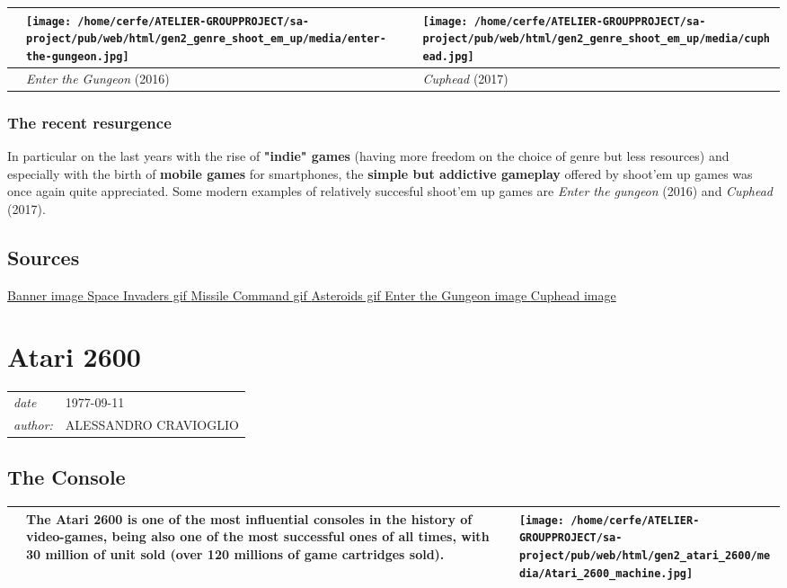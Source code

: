 \documentclass[a4paper,10pt]{book}
\newcommand{\pageHeader}[4]{
    \section{#1}
    \vspace{-0.3cm}
    \begin{table}[h!]
     \begin{tabular}{ll}
        \hline
        \textit{date} & #2 \\
        \textit{author: } & #3\\
        \hline
     \end{tabular}
    \end{table}
    \vspace{-0.3cm}
}
\begin{document}
 
 \begin{longtable}{p{1mm}|l|l|}\hline
 
 & \texttt{[image: /home/cerfe/ATELIER-GROUPPROJECT/sa-project/pub/web/html/gen2\_genre\_shoot\_em\_up/media/enter-the-gungeon.jpg]}
 & \texttt{[image: /home/cerfe/ATELIER-GROUPPROJECT/sa-project/pub/web/html/gen2\_genre\_shoot\_em\_up/media/cuphead.jpg]}
 \\\hline
 
 & \textit{Enter the Gungeon } (2016) 
 & \textit{Cuphead } (2017) 
 \\\hline
 \end{longtable}
 
 \subsubsection{The recent resurgence }
 
 
          In particular on the last years with the rise of  \textbf{"indie" games }  (having more freedom on the choice of genre but less resources) and especially with the birth of  \textbf{mobile games }  for smartphones,
          the  \textbf{simple but addictive gameplay }  offered by shoot'em up games was once again quite appreciated.
          Some modern examples of relatively succesful shoot'em up games are  \textit{Enter the gungeon }(2016) and  \textit{Cuphead }(2017).
         
 
 \subsection{Sources }
 \href{https://www.seekpng.com/png/full/77-774983_shoot-em-ups-logo-shoot-em-ups-logo.png}{Banner image }
 \href{https://miro.medium.com/max/1000/1*qFHnCDhep6OmqkbVN6NY_g.gif}{Space Invaders gif }  
 \href{https://i0.wp.com/www.techsavvyed.net/wp-content/uploads/2012/12/missile-command.gif?resize=598%2C444}{Missile Command gif }  
 \href{https://707232.smushcdn.com/1540253/wp-content/uploads/2020/01/asteroids-atari-2600.gif?lossy=1&strip=1&webp=1}{Asteroids gif }  
 \href{https://www.nintendoworldreport.com/media/44216/1/2.jpg}{Enter the Gungeon image }  
 \href{https://static.wikia.nocookie.net/cuphead/images/0/04/Pic01.jpg/revision/latest/scale-to-width-down/940?cb=20180514011844}{Cuphead image }  
 \newpage\pageHeader{Atari 2600}{1977-09-11}{ALESSANDRO CRAVIOGLIO}{The Atari 2600 is one of the most influential console of the world}
 \subsection{The Console }
 \begin{longtable}{p{1mm}|l|l|}\hline
 
 & \textbf{The Atari 2600 is one of the most influential consoles in the history of video-games, being also one of the most successful
                ones of all times, with 30 million of unit sold (over 120 millions of game cartridges sold). } 
 & \textbf{\texttt{[image: /home/cerfe/ATELIER-GROUPPROJECT/sa-project/pub/web/html/gen2\_atari\_2600/media/Atari\_2600\_machine.jpg]}} 
 \\\hline
 \end{longtable}
 
\end{document}
